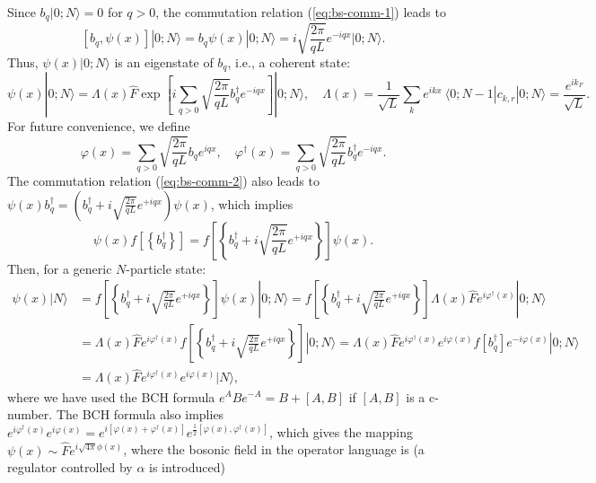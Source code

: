 \documentclass[aps,prb,superscriptaddress,nofootinbib]{revtex4}
\begin{document}
Since $b_q|0;N\rangle=0$ for $q>0$, the commutation relation (\ref{eq:bs-comm-1}) leads to 
\begin{equation*}
	\left[b_{q}, \psi(x)\right]|0;N\rangle = b_{q} \psi(x)|0;N\rangle = i\sqrt{\frac{2\pi}{qL}} e^{-iqx}|0;N\rangle.
\end{equation*}
Thus, $\psi(x)|0;N\rangle$ is an eigenstate of $b_q$, i.e., a coherent state:
\begin{equation*}
	\psi(x)|0;N\rangle
	= \Lambda(x) \hat F \exp\left[i\sum_{q>0} \sqrt{\frac{2\pi}{qL}} b_q^\dagger e^{-iqx}\right]|0;N\rangle,\quad
	\Lambda(x) = \frac{1}{\sqrt L}\sum_k e^{ikx}\ \langle 0;N-1| c_{k,r}|0;N\rangle 
	= \frac{e^{ik_F}}{\sqrt L}.
\end{equation*}
For future convenience, we define
\begin{equation*}
	\varphi(x) = \sum_{q>0} \sqrt{\frac{2\pi}{qL}} b_q e^{iqx},\quad
	\varphi^\dagger(x) = \sum_{q>0} \sqrt{\frac{2\pi}{qL}} b_q^\dagger e^{-iqx}.
\end{equation*}
The commutation relation (\ref{eq:bs-comm-2}) also leads to $\psi(x) b_{q}^{\dagger} =\left(b_{q}^{\dagger}+i\sqrt{\frac{2\pi}{qL}} e^{+iqx}\right) \psi(x)$, which implies
\begin{equation*}
	\psi(x) f\left[\left\{b_{q}^{\dagger}\right\}\right] 
	=f\left[\left\{b_{q}^{\dagger}+i\sqrt{\frac{2\pi}{qL}} e^{+iqx}\right\}\right] \psi(x).
\end{equation*}
Then, for a generic $N$-particle state:
\begin{equation*}
\begin{aligned}
	\psi(x)|N\rangle 
	&= f\left[\left\{b_{q}^{\dagger}+i\sqrt{\frac{2\pi}{qL}} e^{+iqx}\right\}\right] \psi(x)|0;N\rangle
	= f\left[\left\{b_{q}^{\dagger}+i\sqrt{\frac{2\pi}{qL}} e^{+iqx}\right\}\right] \Lambda(x) \hat{F} e^{i\varphi^\dagger(x)}|0;N\rangle \\
	&= \Lambda(x) \hat{F} e^{i\varphi^\dagger(x)} f\left[\left\{b_{q}^{\dagger}+i\sqrt{\frac{2\pi}{qL}} e^{+iqx}\right\}\right]|0;N\rangle 
	= \Lambda(x) \hat{F} e^{i\varphi^\dagger(x)}e^{i\varphi(x)} f\left[b_{q}^{\dagger}\right] e^{-i\varphi(x)}|0;N\rangle \\
	&= \Lambda(x) \hat{F} e^{i\varphi^\dagger(x)} e^{i\varphi(x)}|N\rangle,
\end{aligned}
\end{equation*}
where we have used the BCH formula $e^A B e^{-A} = B + [A,B]$ if $[A,B]$ is a c-number.
The BCH formula also implies $e^{i\varphi^\dagger(x)} e^{i\varphi(x)} = e^{i[\varphi(x)+\varphi^\dagger(x)]}e^{\frac{1}{2}[\varphi(x),\varphi^\dagger(x)]}$, which gives the mapping $\psi(x) \sim \hat{F} e^{i\sqrt{4\pi}\phi(x)}$, where the bosonic field in the operator language is (a regulator controlled by $\alpha$ is introduced)
\end{document}
